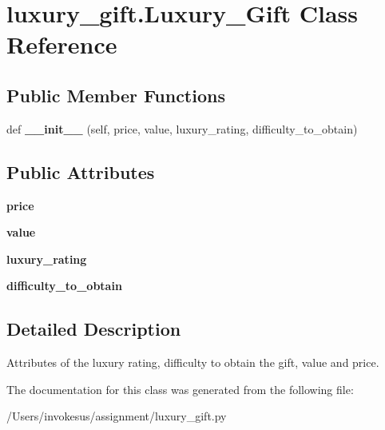 \hypertarget{classluxury__gift_1_1_luxury___gift}{}\section{luxury\+\_\+gift.\+Luxury\+\_\+\+Gift Class Reference}
\label{classluxury__gift_1_1_luxury___gift}
\subsection*{Public Member Functions}
\begin{DoxyCompactItemize}
\item 
\mbox{\label{classluxury__gift_1_1_luxury___gift_ab93b10ec0683264d2c821a4963dd1dd2}} 
def {\bfseries \+\_\+\+\_\+init\+\_\+\+\_\+} (self, price, value, luxury\+\_\+rating, difficulty\+\_\+to\+\_\+obtain)
\end{DoxyCompactItemize}
\subsection*{Public Attributes}
\begin{DoxyCompactItemize}
\item 
\mbox{\label{classluxury__gift_1_1_luxury___gift_a89a67981fa5bffe37e0b241ee35aa706}} 
{\bfseries price}
\item 
\mbox{\label{classluxury__gift_1_1_luxury___gift_a1b6c2d6dc038915cc36ff40707b7bd1f}} 
{\bfseries value}
\item 
\mbox{\label{classluxury__gift_1_1_luxury___gift_a6663d4dd880f62c54414f404de3c6643}} 
{\bfseries luxury\+\_\+rating}
\item 
\mbox{\label{classluxury__gift_1_1_luxury___gift_a585dc4d044e9bac12b7691aa8fd56076}} 
{\bfseries difficulty\+\_\+to\+\_\+obtain}
\end{DoxyCompactItemize}


\subsection{Detailed Description}
\begin{DoxyVerb}Attributes of the luxury rating, difficulty to obtain the gift, value and price.
\end{DoxyVerb}
 

The documentation for this class was generated from the following file\+:\begin{DoxyCompactItemize}
\item 
/\+Users/invokesus/assignment/luxury\+\_\+gift.\+py\end{DoxyCompactItemize}
